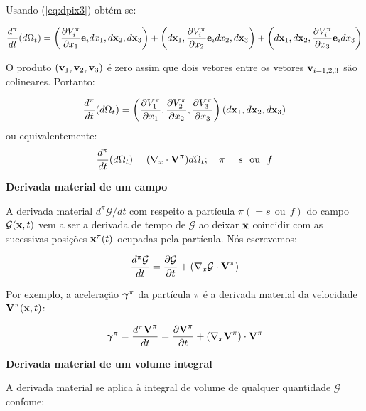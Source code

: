 \documentclass[
	11pt, %
	fleqn, %
	a4paper, %
]{LegrandOrangeBook}
\begin{document}
Usando (\ref{eq:dpix3}) obtém-se:

\begin{equation}
	\label{eq:derivadavolumematerial2}	
	\dfrac{d^\pi}{dt}(d\Omega_t) = \left(\dfrac{\partial V_i^\pi}{\partial x_1}\textbf{e}_idx_1,d\textbf{x}_2,d\textbf{x}_3\right) + \left(d\textbf{x}_1,\dfrac{\partial V_i^\pi}{\partial x_2}\textbf{e}_idx_2,d\textbf{x}_3\right)+\left(d\textbf{x}_1,d\textbf{x}_2,\dfrac{\partial V_i^\pi}{\partial x_3}\textbf{e}_idx_3\right)
\end{equation}

O produto $(\textbf{v}_1,\textbf{v}_2,\textbf{v}_3)$ é zero assim que dois vetores entre os vetores $\textbf{v}_{i=1,2,3}$ são colineares. Portanto:

\begin{equation}
	\label{eq:derivadavolumematerial3}	
	\dfrac{d^\pi}{dt}(d\Omega_t) = \left(\dfrac{\partial V_1^\pi}{\partial x_1},\dfrac{\partial V_2^\pi}{\partial x_2},\dfrac{\partial V_3^\pi}{\partial x_3}\right)(d\textbf{x}_1,d\textbf{x}_2,d\textbf{x}_3)
\end{equation}
ou equivalentemente:
\begin{equation}
	\label{eq:derivadavolumematerial3}	
	\dfrac{d^\pi}{dt}(d\Omega_t) = (\nabla_x \cdot \textbf{V}^\pi)d\Omega_t; ~~~ \pi = s ~~\text{ou} ~~ f
\end{equation}

\textbf{Derivada material de um campo}

A derivada material $d^\pi \mathcal{G}/dt$ com respeito a partícula $\pi (=s~~\text{ou}~~f)$ do campo $\mathcal{G}(\textbf{x}, t)$ vem a ser a derivada de tempo de $\mathcal{G}$ ao deixar $\textbf{x}$ coincidir com as sucessivas posições $\textbf{x}^{\pi}(t)$ ocupadas pela partícula. Nós escrevemos:

\begin{equation}
	\label{eq:derivadavolumematerial4}	
	\frac{d^\pi \mathcal{G}}{dt} = \dfrac{\partial \mathcal{G}}{\partial t} + (\nabla_x \mathcal{G} \cdot \textbf{V}^{\pi})
\end{equation}

Por exemplo, a aceleração $\bm{\gamma}^{\pi}$ da partícula $\pi$ é a derivada material da velocidade $\textbf{V}^{\pi}(\textbf{x},t)$:

\begin{equation}
	\label{eq:derivadavolumematerial5}	
	\bm{\gamma}^{\pi} = \dfrac{d^\pi \textbf{V}^{\pi}}{dt} = \dfrac{\partial \textbf{V}^{\pi}}{\partial t}+(\nabla_x \textbf{V}^{\pi})\cdot \textbf{V}^\pi
\end{equation}

\textbf{Derivada material de um volume integral}

A derivada material se aplica à integral de volume de qualquer quantidade $\mathcal{G}$ confome:
\end{document}
